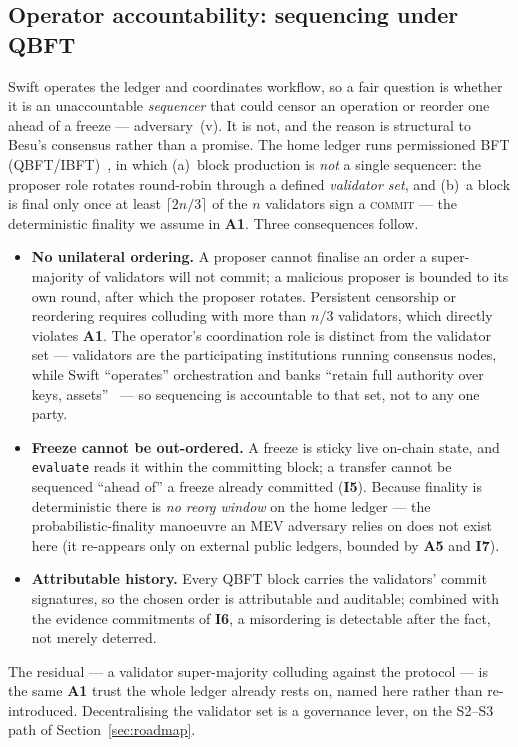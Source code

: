 \documentclass[11pt,a4paper]{article}
\newcommand{\Aref}[1]{\textbf{A#1}}
\newcommand{\Iref}[1]{\textbf{I#1}}
\begin{document}
\subsection{Operator accountability: sequencing under QBFT}
\label{sec:sequencing}
Swift operates the ledger and coordinates workflow, so a fair question is whether
it is an unaccountable \emph{sequencer} that could censor an operation or reorder
one ahead of a freeze --- adversary~(v). It is not, and the reason is structural
to Besu's consensus rather than a promise. The home ledger runs permissioned BFT
(QBFT/IBFT)~\cite{swiftmvp}, in which (a)~block production is \emph{not} a single
sequencer: the proposer role rotates round-robin through a defined \emph{validator
set}, and (b)~a block is final only once at least $\lceil 2n/3 \rceil$ of the $n$
validators sign a \textsc{commit} --- the deterministic finality we assume in
\Aref{1}. Three consequences follow.
\begin{itemize}[leftmargin=1.4em,itemsep=2pt]
  \item \textbf{No unilateral ordering.} A proposer cannot finalise an order a
  super-majority of validators will not commit; a malicious proposer is bounded to
  its own round, after which the proposer rotates. Persistent censorship or
  reordering requires colluding with more than $n/3$ validators, which directly
  violates \Aref{1}. The operator's coordination role is distinct from the
  validator set --- validators are the participating institutions running consensus
  nodes, while Swift ``operates'' orchestration and banks ``retain full authority
  over keys, assets''~\cite{swiftmvp} --- so sequencing is accountable to that set,
  not to any one party.
  \item \textbf{Freeze cannot be out-ordered.} A freeze is sticky live on-chain
  state, and \texttt{evaluate} reads it within the committing block; a transfer
  cannot be sequenced ``ahead of'' a freeze already committed (\Iref{5}). Because
  finality is deterministic there is \emph{no reorg window} on the home ledger ---
  the probabilistic-finality manoeuvre an MEV adversary relies on does not exist
  here (it re-appears only on external public ledgers, bounded by \Aref{5} and
  \Iref{7}).
  \item \textbf{Attributable history.} Every QBFT block carries the validators'
  commit signatures, so the chosen order is attributable and auditable; combined
  with the evidence commitments of \Iref{6}, a misordering is detectable after the
  fact, not merely deterred.
\end{itemize}
The residual --- a validator super-majority colluding against the protocol --- is
the same \Aref{1} trust the whole ledger already rests on, named here rather than
re-introduced. Decentralising the validator set is a governance lever, on the
S2--S3 path of Section~\ref{sec:roadmap}.
\end{document}
